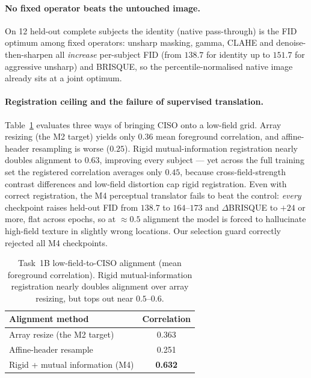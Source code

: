 \documentclass[runningheads]{llncs}
\begin{document}
\paragraph{No fixed operator beats the untouched image.}
On 12 held-out complete subjects the identity (native pass-through) is the FID
optimum among fixed operators: unsharp masking, gamma, CLAHE and
denoise-then-sharpen all \emph{increase} per-subject FID (from $138.7$ for
identity up to $151.7$ for aggressive unsharp) and BRISQUE, so the
percentile-normalised native image already sits at a joint optimum.

\paragraph{Registration ceiling and the failure of supervised translation.}
Table~\ref{tab:reg} evaluates three ways of bringing CISO onto a low-field grid.
Array resizing (the M2 target) yields only $0.36$ mean foreground correlation,
and affine-header resampling is worse ($0.25$). Rigid mutual-information
registration nearly doubles alignment to $0.63$, improving every subject --- yet
across the full training set the registered correlation averages only $0.45$,
because cross-field-strength contrast differences and low-field distortion cap
rigid registration. Even with correct registration, the M4 perceptual translator
fails to beat the control: \emph{every} checkpoint raises held-out FID from
$138.7$ to $164$--$173$ and $\Delta$BRISQUE to $+24$ or more, flat across epochs,
so at $\approx0.5$ alignment the model is forced to hallucinate high-field texture
in slightly wrong locations. Our selection guard correctly rejected all M4
checkpoints.

\begin{table}[htbp]
\caption{Task~1B low-field-to-CISO alignment (mean foreground correlation).
Rigid mutual-information registration nearly doubles alignment over array
resizing, but tops out near $0.5$--$0.6$.}
\label{tab:reg}
\centering
\small
\begin{tabular}{lc}
\toprule
Alignment method & Correlation \\
\midrule
Array resize (the M2 target)        & 0.363 \\
Affine-header resample              & 0.251 \\
Rigid + mutual information (M4)     & \textbf{0.632} \\
\bottomrule
\end{tabular}
\end{table}
\end{document}

